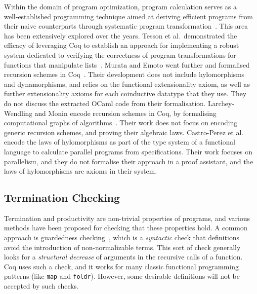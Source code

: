 \documentclass[ a4paper, UKenglish, cleveref, autoref, thm-restate]{lipics-v2021}
\newcommand{\mvol}[1]{\textcolor{blue}{\textsc{Michael}: #1}}
\newcommand{\haskell}[1]{\texttt{#1}}
\begin{document}
Within the domain of program optimization, program calculation serves as a
well-established programming technique aimed at deriving efficient programs
from their naive counterparts through systematic program
transformation~\cite{gibbonsSquiggol}. This area has been extensively explored
over the years. Tesson et al.\ demonstrated the efficacy of leveraging Coq to
establish an approach for implementing a robust system dedicated to verifying
the correctness of program transformations for functions that manipulate
lists~\cite{10.1007/978-3-642-17796-5_10}. Murata and Emoto went further and
formalised recursion schemes in Coq~\cite{MurataE19}. Their development does
not include hylomorphisms and dynamorphisms, and relies on the functional
extensionality axiom, as well as further extensionality axioms for each
coinductive datatype that they use. They do not discuss the extracted OCaml
code from their formalisation.  Larchey-Wendling and Monin encode recursion
schemes in Coq, by formalising computational graphs of
algorithms~\cite{larchey2022braga}. Their work does not focus on encoding
generic recursion schemes, and proving their algebraic laws.  Castro-Perez et
al.~\cite{farmsCastro} encode the laws of hylomorphisms as part of the type
system of a functional language to calculate parallel programs from
specifications. Their work focuses on parallelism, and they do not formalise
their approach in a proof assistant, and the laws of hylomorphisms are axioms
in their system.


\subsection{Termination Checking}\label{sec:termcheck}

Termination and productivity are non-trivial properties of programs, and various
methods have been proposed for checking that these properties hold. A common
approach is guardedness checking~\cite{10.5555/646535.695850}, which is a
\emph{syntactic} check that definitions avoid the introduction of
non-normalizable terms. This sort of check generally looks for a
\emph{structural decrease} of arguments in the recursive calls of a function.
Coq uses such a check, and it works for many classic functional programming
patterns (like \haskell{map} and \haskell{foldr}). However, some desirable
definitions will not be accepted by such checks.
\end{document}
